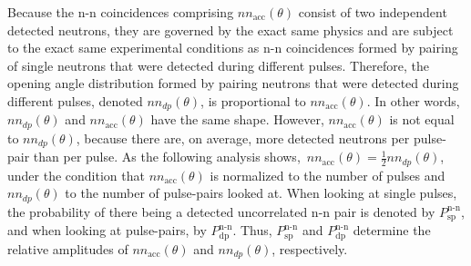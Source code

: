 Because the n-n coincidences comprising $nn_{\text{acc}}(\theta)$ consist of two independent detected neutrons, they are governed by the exact same physics and are subject to the exact same experimental conditions as n-n coincidences formed by pairing of single neutrons that were detected during different pulses.
Therefore, the opening angle distribution formed by pairing neutrons that were detected during different pulses, denoted $nn_{dp}(\theta)$, is proportional to $nn_{\text{acc}}(\theta)$.
In other words,  $nn_{dp}(\theta)$ and $nn_{\text{acc}}(\theta)$ have the same shape.
However, $nn_{\text{acc}}(\theta)$ is not equal to $nn_{dp}(\theta)$,  because there are, on average, more detected neutrons per pulse-pair than per pulse.
As the following analysis shows,~$nn_{\text{acc}}(\theta) = \frac{1}{2}nn_{dp}(\theta)$, under the condition that $nn_{\text{acc}}(\theta)$ is normalized to the number of pulses and $nn_{dp}(\theta)$ to the number of pulse-pairs looked at.
When looking at single pulses, the probability of there being a detected uncorrelated n-n pair is denoted by $P^{\text{n-n}}_{\text{sp}}$, and when looking at pulse-pairs, by $P^{\text{n-n}}_{\text{dp}}$.
Thus, $P^{\text{n-n}}_{\text{sp}}$ and $P^{\text{n-n}}_{\text{dp}}$ determine the relative amplitudes of $nn_{\text{acc}}(\theta)$ and $nn_{dp}(\theta)$, respectively.

